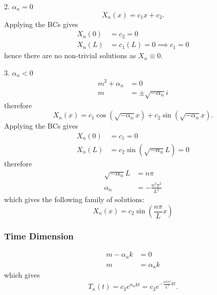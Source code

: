 \documentclass{article}
\begin{document}
\begin{proofcase}{2. \(\alpha_n = 0\)}\let\qed\relax
    \begin{equation*}
        X_n\left( x \right) = c_1 x + c_2.
    \end{equation*}
    Applying the BCs gives
    \begin{align*}
        X_n\left( 0 \right) & = c_2 = 0                                   \\
        X_n\left( L \right) & = c_1 \left( L \right) = 0 \implies c_1 = 0
    \end{align*}
    hence there are no non-trivial solutions as \(X_n \equiv 0\).
\end{proofcase}
\begin{proofcase}{3. \(\alpha_n < 0\)}\let\qed\relax
    \begin{align*}
        m^2 + \alpha_n & = 0                      \\
        m              & = \pm \sqrt{-\alpha_n} i
    \end{align*}
    therefore
    \begin{equation*}
        X_n\left( x \right) = c_1 \cos{\left( \sqrt{-\alpha_n} x \right)} + c_2 \sin{\left( \sqrt{-\alpha_n} x \right)}.
    \end{equation*}
    Applying the BCs gives
    \begin{align*}
        X_n\left( 0 \right) & = c_1 = 0                                         \\
        X_n\left( L \right) & = c_2 \sin{\left( \sqrt{-\alpha_n} L \right)} = 0
    \end{align*}
    therefore
    \begin{align*}
        \sqrt{-\alpha_n} L & = n \pi                  \\
        \alpha_n           & = -\frac{n^2 \pi^2}{L^2}
    \end{align*}
    which gives the following family of solutions:
    \begin{equation*}
        X_n\left( x \right) = c_2 \sin{\left( \frac{n \pi}{L} x \right)}
    \end{equation*}
\end{proofcase}
\subsubsection{Time Dimension}
\begin{align*}
    m - \alpha_n k & = 0          \\
    m              & = \alpha_n k
\end{align*}
which gives
\begin{equation*}
    T_n\left( t \right) = c_3 e^{\alpha_n k t} = c_3 e^{-\frac{n^2 \pi^2}{L^2} k t}.
\end{equation*}
\end{document}
